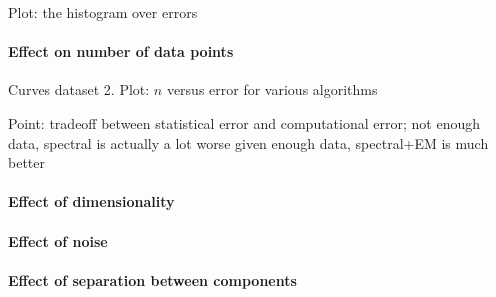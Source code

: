 Plot: the histogram over errors

\paragraph{Effect on number of data points}

Curves dataset 2.
Plot: $n$ versus error for various algorithms

Point: tradeoff between statistical error and computational error;
not enough data, spectral is actually a lot worse
given enough data, spectral+EM is much better

\paragraph{Effect of dimensionality}

\paragraph{Effect of noise}

\paragraph{Effect of separation between components}
